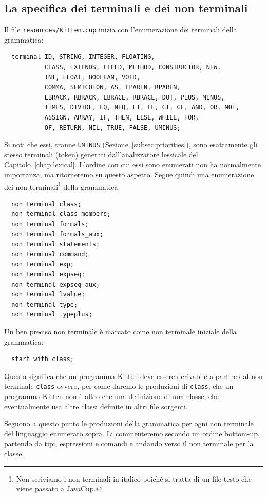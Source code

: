 \subsection{La specifica dei terminali e dei non terminali}
  \label{subsec:terminals}
%
Il file \texttt{resources/Kitten.cup}
inizia con l'enumerazione dei terminali della grammatica:
%
\begin{verbatim}
  terminal ID, STRING, INTEGER, FLOATING,
           CLASS, EXTENDS, FIELD, METHOD, CONSTRUCTOR, NEW,
           INT, FLOAT, BOOLEAN, VOID,
           COMMA, SEMICOLON, AS, LPAREN, RPAREN,
           LBRACK, RBRACK, LBRACE, RBRACE, DOT, PLUS, MINUS,
           TIMES, DIVIDE, EQ, NEQ, LT, LE, GT, GE, AND, OR, NOT,
           ASSIGN, ARRAY, IF, THEN, ELSE, WHILE, FOR,
           OF, RETURN, NIL, TRUE, FALSE, UMINUS;
\end{verbatim}
%
Si noti che essi, tranne \texttt{UMINUS} (Sezione~\ref{subsec:priorities}),
sono esattamente gli stesso terminali (token) generati
dall'analizzatore lessicale del Capitolo~\ref{chap:lexical}. L'ordine
con cui essi sono enumerati non ha normalmente importanza, ma
ritorneremo su questo aspetto.
Segue quindi una enumerazione dei non terminali\footnote{
Non scriviamo i non terminali
in italico poich\'e si tratta di un file testo che viene passato a JavaCup.}
della grammatica:
%
\begin{verbatim}
  non terminal class;
  non terminal class_members;
  non terminal formals;
  non terminal formals_aux;
  non terminal statements;
  non terminal command;
  non terminal exp;
  non terminal expseq;
  non terminal expseq_aux;
  non terminal lvalue;
  non terminal type;
  non terminal typeplus;
\end{verbatim}
%
Un ben preciso non terminale \`e marcato come non terminale iniziale della
grammatica:
%
\begin{verbatim}
  start with class;
\end{verbatim}
%
Questo significa che un programma Kitten deve essere derivabile a partire
dal non terminale \texttt{class} ovvero, per come daremo le produzioni di
\texttt{class}, che un programma Kitten non \`e altro che una definizione
di una classe, che eventualmente usa altre classi definite in altri file
sorgenti.

Seguono a questo punto le produzioni della grammatica per ogni non terminale
del linguaggio enumerato sopra. Li commenteremo secondo un ordine bottom-up,
partendo \cioe da tipi, espressioni e comandi e andando verso
il non terminale per la classe.
%
